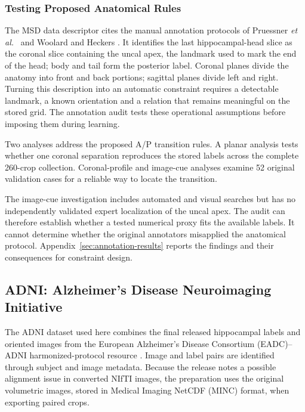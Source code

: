\documentclass[12pt,a4paper]{article}
\begin{document}
\subsubsection{Testing Proposed Anatomical Rules}
\label{sec:annotation-compatibility}

The MSD data descriptor \cite{simpson2019dataset} cites the manual
annotation protocols of Pruessner \emph{et al.}\
\cite{pruessner2000volumetry} and Woolard and Heckers
\cite{woolard2012asymmetry}. It identifies the last hippocampal-head slice
as the coronal slice containing the uncal apex, the landmark used to mark
the end of the head; body and tail form the posterior label. Coronal planes
divide the anatomy into front and back portions; sagittal planes divide left
and right. Turning this description into an automatic constraint requires a
detectable landmark, a known orientation and a relation that remains
meaningful on the stored grid. The annotation audit tests these operational
assumptions before imposing them during learning.

Two analyses address the proposed A/P transition rules. A planar analysis tests
whether one coronal separation reproduces the stored labels across the
complete 260-crop collection. Coronal-profile and image-cue analyses examine 52 original
validation cases for a reliable way to locate the transition.

The image-cue investigation includes automated and visual searches but
has no independently validated expert localization of the uncal apex.
The audit can therefore establish whether a tested numerical proxy fits
the available labels. It cannot determine whether the original annotators
misapplied the anatomical protocol. Appendix~\ref{sec:annotation-results}
reports the findings and their consequences for constraint design.


\subsection{ADNI: Alzheimer's Disease Neuroimaging Initiative}
\label{sec:adni-methods}

The ADNI dataset used here combines the final released hippocampal labels
and oriented images from the European Alzheimer's Disease Consortium
(EADC)--ADNI harmonized-protocol resource \cite{harpReleasedLabels}. Image
and label pairs are identified through subject and image metadata. Because
the release notes a possible alignment issue in converted NIfTI images, the
preparation uses the original volumetric images, stored in Medical
Imaging NetCDF (MINC) format, when exporting paired crops.
\end{document}
